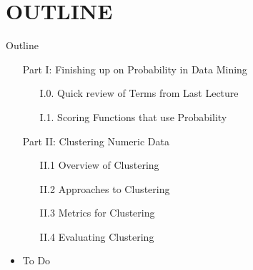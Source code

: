 \documentclass[handout]{beamer}
\begin{document}
\section*{OUTLINE}
\begin{frame}{Outline}
\begin{itemize}
\item[] Part I: Finishing up on Probability in Data Mining
	\begin{itemize}
	\item[I.0.] Quick review of Terms from Last Lecture
	\item[I.1.] Scoring Functions that use Probability
	\end{itemize}
\vspace*{0.3cm}
\item[] Part II: Clustering Numeric Data
	\begin{itemize}
	\item[II.1] Overview of Clustering
	\item[II.2] Approaches to Clustering
	\item[II.3] Metrics for Clustering
	\item[II.4] Evaluating Clustering
	\end{itemize}
\vspace*{0.3cm}
\item To Do
\end{itemize}
\end{frame}




\end{document}

